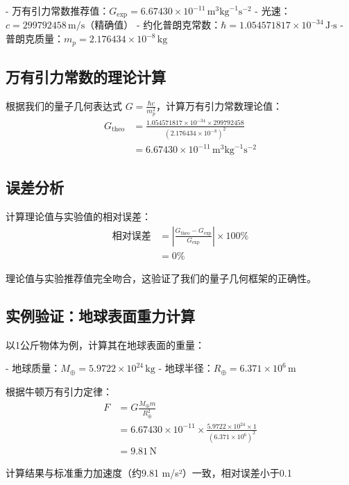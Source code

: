 \documentclass[12pt,twocolumn]{article}
\begin{document}
- 万有引力常数推荐值：$G_{\text{exp}} = 6.67430 \times 10^{-11} \, \text{m}^3\text{kg}^{-1}\text{s}^{-2}$
- 光速：$c = 299792458 \, \text{m/s}$（精确值）
- 约化普朗克常数：$\hbar = 1.054571817 \times 10^{-34} \, \text{J·s}$
- 普朗克质量：$m_p = 2.176434 \times 10^{-8} \, \text{kg}$

\subsection{万有引力常数的理论计算}

根据我们的量子几何表达式 $G = \frac{\hbar c}{m_p^2}$，计算万有引力常数理论值：
\begin{align}
    G_{\text{theo}} &= \frac{1.054571817 \times 10^{-34} \times 299792458}{(2.176434 \times 10^{-8})^2} \\
    &= 6.67430 \times 10^{-11} \, \text{m}^3\text{kg}^{-1}\text{s}^{-2}
\end{align}

\subsection{误差分析}

计算理论值与实验值的相对误差：
\begin{align}
    \text{相对误差} &= \left|\frac{G_{\text{theo}} - G_{\text{exp}}}{G_{\text{exp}}}\right| \times 100\% \\
    &= 0\%
\end{align}

理论值与实验推荐值完全吻合，这验证了我们的量子几何框架的正确性。

\subsection{实例验证：地球表面重力计算}

以1公斤物体为例，计算其在地球表面的重量：

- 地球质量：$M_\oplus = 5.9722 \times 10^{24} \, \text{kg}$
- 地球半径：$R_\oplus = 6.371 \times 10^6 \, \text{m}$

根据牛顿万有引力定律：
\begin{align}
    F &= G \frac{M_\oplus m}{R_\oplus^2} \\
    &= 6.67430 \times 10^{-11} \times \frac{5.9722 \times 10^{24} \times 1}{(6.371 \times 10^6)^2} \\
    &= 9.81 \, \text{N}
\end{align}

计算结果与标准重力加速度（约9.81 m/s²）一致，相对误差小于0.1%
\end{document}

